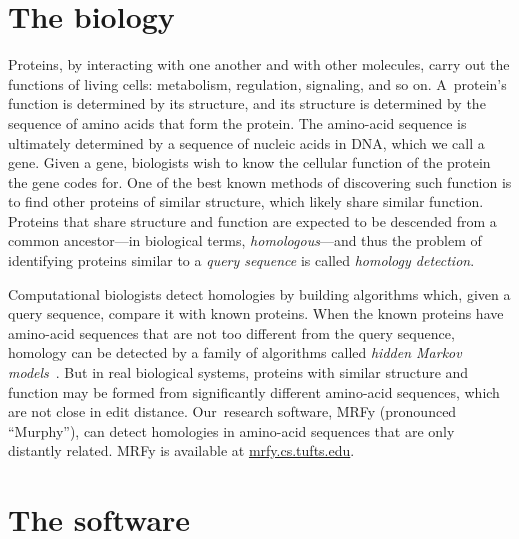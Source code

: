 \documentclass[preprint,nonatbib,blockstyle,times]{sigplanconf}
\newcommand\secref[1]{Section~\ref{sec:#1}}
\let\cite\citep
\begin{document}
\section{The biology}

Proteins, by
interacting with one another and with other 
molecules, carry out the functions of living cells: metabolism, regulation, 
signaling, and so on.
A~protein's function is determined by its structure, 
and its structure is determined by the sequence of amino acids that
form the protein.
The amino-acid sequence is ultimately determined by a sequence of
nucleic acids in DNA, which we call a gene.
Given a gene, biologists wish to know the cellular
function of the protein the gene codes for.
One of the best known methods of discovering such function is
to find other proteins of 
similar structure, which likely share similar function.
Proteins that share structure and function are expected to be
descended from a common ancestor---in biological terms, \emph{homologous}---and
thus
the problem of identifying proteins similar to a \textit{query sequence} is called 
\textit{homology detection}.




Computational biologists detect homologies by building 
algorithms which, given a {query sequence}, %
compare it with known proteins.
When the known proteins have amino-acid sequences that
are not too different from the query sequence, homology can be
detected by
a family of algorithms called 
\textit{hidden Markov models}~\cite{Eddy:1998ut}.
But in real biological systems,
proteins with similar structure and function may be formed from significantly 
different amino-acid sequences, which are not close in edit distance.
Our~research software, MRFy (pronounced
``Murphy''), can detect homologies 
in amino-acid sequences that are only distantly related.
MRFy is available at \url{mrfy.cs.tufts.edu}.
%
%

%
%
%


\section{The software}
\end{document}
